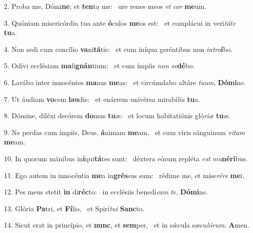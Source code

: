 2. Proba me, Dómi\textbf{ne}, et \textbf{ten}ta me: \ast\  ure renes meos \textit{et} \textit{cor} \textbf{me}um.\

3. Quóniam misericórdia tua ante \textbf{ó}culos \textbf{me}os est: \ast\  et complácui in veri\textit{tá}\textit{te} \textbf{tu}a.\

4. Non sedi cum concílio \textbf{va}ni\textbf{tá}tis: \ast\  et cum iníqua geréntibus non \textit{in}\textit{tro}\textbf{í}bo.\

5. Odívi ecclésiam \textbf{ma}li\textbf{gnán}tium: \ast\  et cum ímpiis \textit{non} \textit{se}\textbf{dé}bo.\

6. Lavábo inter innocéntes \textbf{ma}nus \textbf{me}as: \ast\  et circúmdabo altáre \textit{tu}\textit{um}, \textbf{Dó}\textbf{mi}ne.\

7. Ut áudiam \textbf{vo}cem \textbf{lau}dis: \ast\  et enárrem univérsa mirabí\textit{li}\textit{a} \textbf{tu}a.\

8. Dómine, diléxi decórem \textbf{do}mus \textbf{tu}æ: \ast\  et locum habitatiónis gló\textit{ri}\textit{æ} \textbf{tu}æ.\

9. Ne perdas cum ímpiis, Deus, \textbf{á}nimam \textbf{me}am, \ast\  et cum viris sánguinum \textit{vi}\textit{tam} \textbf{me}am.\

10. In quorum mánibus in\textbf{i}qui\textbf{tá}tes sunt: \ast\  déxtera eórum repléta \textit{est} \textit{mu}\textbf{né}\textbf{ri}bus.\

11. Ego autem in innocéntia \textbf{me}a in\textbf{grés}sus sum: \ast\  rédime me, et mise\textit{ré}\textit{re} \textbf{me}i.\

12. Pes meus stetit \textbf{in} di\textbf{réc}to: \ast\  in ecclésiis benedí\textit{cam} \textit{te}, \textbf{Dó}\textbf{mi}ne.\

13. Glória \textbf{Pa}tri, et \textbf{Fí}lio, \ast\  et Spirí\textit{tu}\textit{i} \textbf{Sanc}to.\

14. Sicut erat in princípio, et \textbf{nunc}, et \textbf{sem}per, \ast\  et in sǽcula sæcu\textit{ló}\textit{rum}. \textbf{A}men.\

